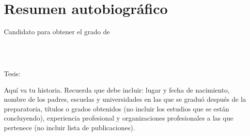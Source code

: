 
\chapter*{Resumen autobiográfico}
\thispagestyle{empty}

\begin{center}
\autor

Candidato para obtener el grado de\\
\grado\\
\orientacion\bigskip

\uanl\\
\fime\bigskip

Tesis:\\
\textsc{\large\titulo}
\end{center}\bigskip

Aquí va tu historia. Recuerda que debe incluir: lugar y fecha de nacimiento, nombre de los padres, escuelas y universidades en las que se graduó después de la preparatoria, títulos o grados obtenidos (no incluir los estudios que se están concluyendo), experiencia profesional y organizaciones profesionales a las que pertenece (no incluir lista de publicaciones).
